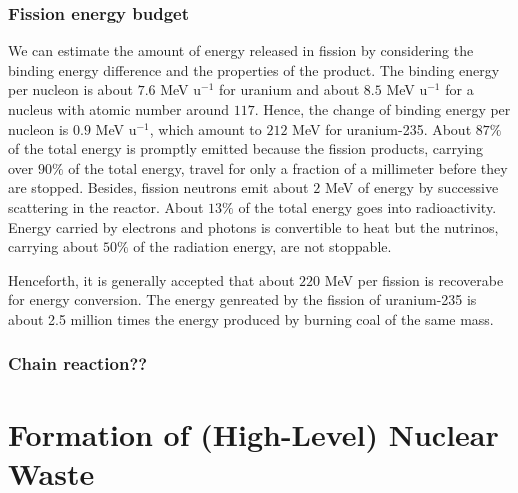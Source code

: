 \documentclass[preprint,aip,pra]{revtex4-1}
\begin{document}
        \subsubsection{Fission energy budget}
        We can estimate the amount of energy released in fission by considering the binding energy difference
        and the properties of the product.
        The binding energy per nucleon is about $7.6$ MeV u${}^{-1}$ for uranium and about $8.5$ MeV u${}^{-1}$
        for a nucleus with atomic number around $117$. Hence, the change of binding energy per nucleon is
        $0.9$ MeV u${}^{-1}$, which amount to $212$ MeV for uranium-235.
        About $87\%$ of the total energy is promptly emitted because
        the fission products, carrying over $90\%$ of the total energy, travel for only a fraction of a
        millimeter before they are stopped. Besides, fission neutrons emit about $2$ MeV of energy by
        successive scattering in the reactor.
        About $13\%$ of the total energy goes into radioactivity. Energy carried by electrons and photons is
        convertible to heat but the nutrinos, carrying about $50\%$ of the radiation energy, are not stoppable.

        Henceforth, it is generally accepted that about $220$ MeV per fission is recoverabe for energy conversion.
        The energy genreated by the fission of uranium-235 is 
        about 2.5 million times the energy produced by burning coal of the same mass.\cite{e17}
        \subsubsection{Chain reaction??}

\section{Formation of (High-Level) Nuclear Waste}
\end{document}
